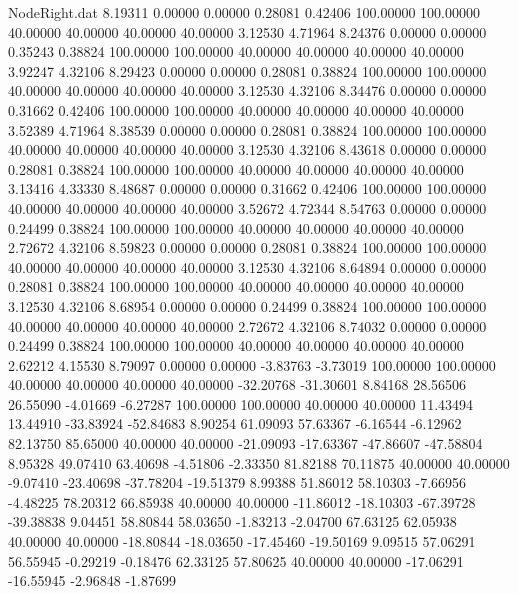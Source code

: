 \begin{filecontents}{NodeRight.dat}
   8.19311    0.00000    0.00000     0.28081    0.42406  100.00000  100.00000   40.00000   40.00000   40.00000   40.00000    3.12530    4.71964
   8.24376    0.00000    0.00000     0.35243    0.38824  100.00000  100.00000   40.00000   40.00000   40.00000   40.00000    3.92247    4.32106
   8.29423    0.00000    0.00000     0.28081    0.38824  100.00000  100.00000   40.00000   40.00000   40.00000   40.00000    3.12530    4.32106
   8.34476    0.00000    0.00000     0.31662    0.42406  100.00000  100.00000   40.00000   40.00000   40.00000   40.00000    3.52389    4.71964
   8.38539    0.00000    0.00000     0.28081    0.38824  100.00000  100.00000   40.00000   40.00000   40.00000   40.00000    3.12530    4.32106
   8.43618    0.00000    0.00000     0.28081    0.38824  100.00000  100.00000   40.00000   40.00000   40.00000   40.00000    3.13416    4.33330
   8.48687    0.00000    0.00000     0.31662    0.42406  100.00000  100.00000   40.00000   40.00000   40.00000   40.00000    3.52672    4.72344
   8.54763    0.00000    0.00000     0.24499    0.38824  100.00000  100.00000   40.00000   40.00000   40.00000   40.00000    2.72672    4.32106
   8.59823    0.00000    0.00000     0.28081    0.38824  100.00000  100.00000   40.00000   40.00000   40.00000   40.00000    3.12530    4.32106
   8.64894    0.00000    0.00000     0.28081    0.38824  100.00000  100.00000   40.00000   40.00000   40.00000   40.00000    3.12530    4.32106
   8.68954    0.00000    0.00000     0.24499    0.38824  100.00000  100.00000   40.00000   40.00000   40.00000   40.00000    2.72672    4.32106
   8.74032    0.00000    0.00000     0.24499    0.38824  100.00000  100.00000   40.00000   40.00000   40.00000   40.00000    2.62212    4.15530
   8.79097    0.00000    0.00000    -3.83763   -3.73019  100.00000  100.00000   40.00000   40.00000   40.00000   40.00000  -32.20768  -31.30601
   8.84168   28.56506   26.55090    -4.01669   -6.27287  100.00000  100.00000   40.00000   40.00000   11.43494   13.44910  -33.83924  -52.84683
   8.90254   61.09093   57.63367    -6.16544   -6.12962   82.13750   85.65000   40.00000   40.00000  -21.09093  -17.63367  -47.86607  -47.58804
   8.95328   49.07410   63.40698    -4.51806   -2.33350   81.82188   70.11875   40.00000   40.00000   -9.07410  -23.40698  -37.78204  -19.51379
   8.99388   51.86012   58.10303    -7.66956   -4.48225   78.20312   66.85938   40.00000   40.00000  -11.86012  -18.10303  -67.39728  -39.38838
   9.04451   58.80844   58.03650    -1.83213   -2.04700   67.63125   62.05938   40.00000   40.00000  -18.80844  -18.03650  -17.45460  -19.50169
   9.09515   57.06291   56.55945    -0.29219   -0.18476   62.33125   57.80625   40.00000   40.00000  -17.06291  -16.55945   -2.96848   -1.87699

\end{filecontents}
